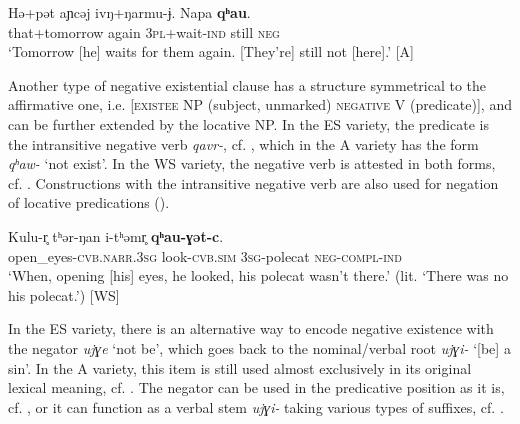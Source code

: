 \documentclass[output=paper,colorlinks,citecolor=brown]{langscibook}
\begin{document}
\ea\label{ex:niv:35}
    \gll Hǝ+pǝt aɲcǝj ivŋ+ŋarmu-ɉ. Napa \textbf{qʰau}. \\ 
         that+tomorrow again \textsc{3pl}+wait-\textsc{ind} still \textsc{neg} \\
    \glt ‘Tomorrow [he] waits for them again. [They’re] still not [here].’ \citep[248]{Panfilov1965} [A]
\z 

Another type of negative existential clause has a structure symmetrical to the affirmative one, i.e. [\textsc{existee} NP (subject, unmarked) \textsc{negative} \textsc{V} (predicate)], and can be further extended by the locative NP. In the ES variety, the predicate is the intransitive negative verb \textit{qavr-}, cf. , which in the A variety has the form \textit{qʰaw-} ‘not exist’. In the WS variety, the negative verb is attested in both forms, cf. . Constructions with the intransitive negative verb are also used for negation of locative predications ().


\ea\label{ex:niv:37}
    \gll  Kulu-r̥ tʰər-ŋan i-tʰəmr̥  \textbf{qʰau-ɣət-c}. \\ 
         open\_eyes-\textsc{cvb.narr.3sg} look-\textsc{cvb.sim} \textsc{3sg-}polecat \textsc{neg-compl-ind}\\
    \glt ‘When, opening [his] eyes, he looked, his polecat wasn’t there.’ (lit. ‘There was no his polecat.’) \citep[248]{Panfilov1965} [WS]
\z 

In the ES variety, there is an alternative way to encode negative existence with the negator \textit{ujɣe} ‘not be’, which goes back to the nominal/verbal root \textit{ujɣi-} ‘[be] a sin’. In the A variety, this item is still used almost exclusively in its original lexical meaning, cf. . The negator can be used in the predicative position as it is, cf. , or it can function as a verbal stem \textit{ujɣi-} taking various types of suffixes, cf. .
\end{document}
